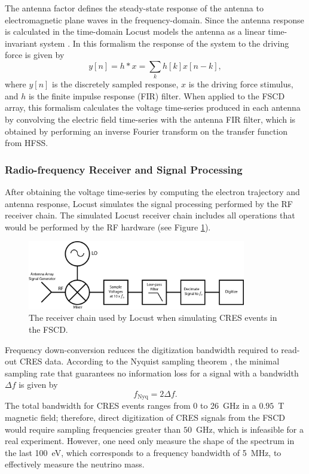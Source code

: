 The antenna factor defines the steady-state response of the antenna to electromagnetic plane waves in the frequency-domain. Since the antenna response is calculated in the time-domain Locust models the antenna as a linear time-invariant system \cite{lti_theory_wiki}. In this formalism the response of the system to the driving force is given by 
\begin{equation}
    y[n] = h\ast x=\sum_{k}{h[k]x[n-k]},
\end{equation}
where $y[n]$ is the discretely sampled response, $x$ is the driving force stimulus, and $h$ is the finite impulse response (FIR) filter. When applied to the FSCD array, this formalism calculates the voltage time-series produced in each antenna by convolving the electric field time-series with the antenna FIR filter, which is obtained by performing an inverse Fourier transform on the transfer function from HFSS. 

\subsubsection*{Radio-frequency Receiver and Signal Processing}

After obtaining the voltage time-series by computing the electron trajectory and antenna response, Locust simulates the signal processing performed by the RF receiver chain. The simulated Locust receiver chain includes all operations that would be performed by the RF hardware (see Figure \ref{fig:chap4-locust-receiver-chain}). 

\begin{figure}[htbp]
    \centering
    \includegraphics[width=0.85\textwidth]{figs/Chapter-4/230511_locust_receiver_chain.png}
    \caption{The receiver chain used by Locust when simulating CRES events in the FSCD.}
\label{fig:chap4-locust-receiver-chain}
\end{figure}

Frequency down-conversion reduces the digitization bandwidth required to read-out CRES data. According to the Nyquist sampling theorem \cite{nyquist_sampling}, the minimal sampling rate that guarantees no information loss for a signal with a bandwidth $\Delta f$ is given by
\begin{equation}
    f_{\textrm{Nyq}}=2\Delta f.
\end{equation}
The total bandwidth for CRES events ranges from 0 to 26~GHz in a $0.95$~T magnetic field; therefore, direct digitization of CRES signals from the FSCD would require sampling frequencies greater than $50$~GHz, which is infeasible for a real experiment. However, one need only measure the shape of the spectrum in the last 100~eV, which corresponds to a frequency bandwidth of 5~MHz, to effectively measure the neutrino mass. 

